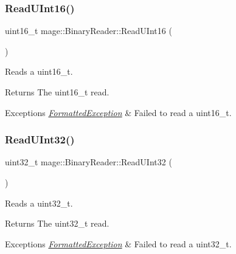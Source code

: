 \subsubsection{\texorpdfstring{Read\+U\+Int16()}{ReadUInt16()}}
{\footnotesize\ttfamily uint16\+\_\+t mage\+::\+Binary\+Reader\+::\+Read\+U\+Int16 (\begin{DoxyParamCaption}{ }\end{DoxyParamCaption})\hspace{0.3cm}{\ttfamily [protected]}}

Reads a {\ttfamily uint16\+\_\+t}.

\begin{DoxyReturn}{Returns}
The {\ttfamily uint16\+\_\+t} read. 
\end{DoxyReturn}

\begin{DoxyExceptions}{Exceptions}
{\em \hyperlink{structmage_1_1_formatted_exception}{Formatted\+Exception}} & Failed to read a {\ttfamily uint16\+\_\+t}. \\
\hline
\end{DoxyExceptions}
\hypertarget{classmage_1_1_binary_reader_a4decb312a91e30406b82178268053f53}{}\label{classmage_1_1_binary_reader_a4decb312a91e30406b82178268053f53} 
\subsubsection{\texorpdfstring{Read\+U\+Int32()}{ReadUInt32()}}
{\footnotesize\ttfamily uint32\+\_\+t mage\+::\+Binary\+Reader\+::\+Read\+U\+Int32 (\begin{DoxyParamCaption}{ }\end{DoxyParamCaption})\hspace{0.3cm}{\ttfamily [protected]}}

Reads a {\ttfamily uint32\+\_\+t}.

\begin{DoxyReturn}{Returns}
The {\ttfamily uint32\+\_\+t} read. 
\end{DoxyReturn}

\begin{DoxyExceptions}{Exceptions}
{\em \hyperlink{structmage_1_1_formatted_exception}{Formatted\+Exception}} & Failed to read a {\ttfamily uint32\+\_\+t}. \\
\hline
\end{DoxyExceptions}
\hypertarget{classmage_1_1_binary_reader_a480f2bd7320beed37a71b8122c8550bd}{}\label{classmage_1_1_binary_reader_a480f2bd7320beed37a71b8122c8550bd} 
